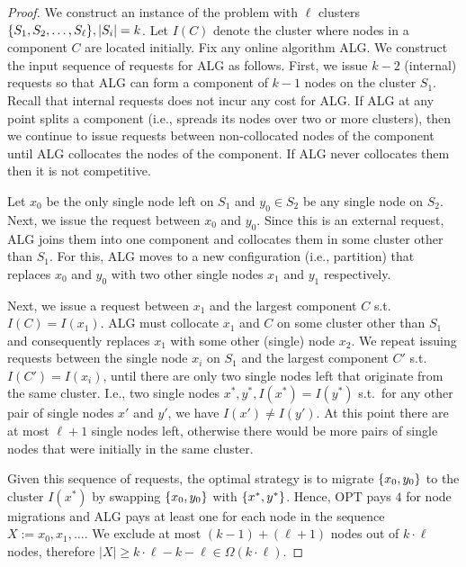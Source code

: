\documentclass[manuscript,screen=true]{acmart}
\newcommand{\ALG}{ALG}
\newcommand{\PPOBRP}{PP-BRP}
\DeclarePairedDelimiter\set{\{}{\}}
\newcommand\maciek[1]{\color{brown}\textbf{\\ Maciek: #1}\color{black}}
\begin{document}
\begin{proof}
	We construct an instance of the problem with $\ell$ clusters 
	$\set{ S_1, S_2,\dots , S_{\ell}}, |S_i|  = k$.
	Let $I(C)$ denote the cluster where nodes in a component $C$ are located initially.
	Fix any online algorithm \ALG{}.
	We construct the input sequence of requests for \ALG{} as follows.
	First,
	we issue $k-2$ (internal) requests so that \ALG{} can form a component of $k-1$
	nodes on the cluster $S_1$.
	Recall that internal requests does not incur any cost for \ALG{}.
	If \ALG{} at any point splits a component
	(i.e., spreads its nodes over two or more clusters),
	then we continue to issue requests between non-collocated nodes of the component until \ALG{} collocates the nodes of the component.
	If \ALG{} never collocates them then it is not competitive.
	
	Let $x_0$  be the only single node left on $S_1$ and  $y_0 \in S_2$ be any single node on $S_2$.
	Next,
	we issue the request between $x_0$ and $y_0$.
	Since this is an external request,
	\ALG{} joins them into one component and collocates them in some cluster other than $S_1$.
	For this,
	\ALG{} moves to a new configuration (i.e., partition)
	that replaces $x_0$ and $y_0$ with two other single nodes $x_1$ and $y_1$ respectively.
	
	Next,
	we issue a request between $x_1$ and the largest component $C$ s.t.~$I(C) = I(x_1)$.
	\ALG{} must collocate $x_1$ and $C$ on some cluster other than $S_1$ and
	consequently replaces $x_1$ with some other (single) node $x_2$.
	We repeat issuing requests between the single node $x_i$ on $S_1$ and the largest component $C'$ s.t.~$I(C')=I(x_i)$,
	until there are only two single nodes left that  originate from the same cluster.
	I.e.,
	two single nodes $x^*, y^*,I(x^*) = I(y^*)$ s.t.~for any other pair of single nodes
	$x'$ and $y'$,
	we have $I(x') \neq I(y')$.
	At this point there are at most $\ell+1$ single nodes left,
	otherwise there would be more pairs of single nodes that were initially in the same cluster.
	
	Given this sequence of requests,
	the optimal strategy is to migrate $\set{x_0,y_0}$ to the cluster $I(x^*)$ by
	swapping $\set{x_0,y_0}$ with $\set{x^*,y^*}$.
	Hence,
	OPT pays $4$ for node migrations and
	\ALG{} pays at least one for each node in the sequence $X := x_0, x_1,\dots$.
	We exclude at most $(k-1) + ( \ell+1)$ nodes out of $k \cdot \ell$ nodes,
	therefore $|X| \geq k \cdot \ell - k - \ell \in \Omega(k\cdot\ell)$.
\end{proof}
\end{document}
